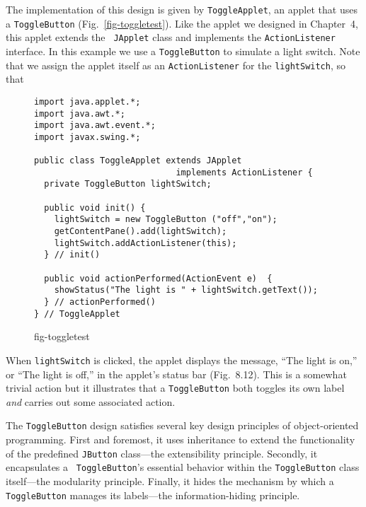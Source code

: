 The implementation of this design is given by {\tt ToggleApplet}, an
applet that uses a {\tt ToggleButton} (Fig.~\ref{fig-toggletest}).
Like the applet we designed in Chapter~4, this applet extends the {\tt
JApplet} class and implements the {\tt ActionListener} interface.  In
this example we use a {\tt ToggleButton} to simulate a light switch.
Note that we assign the applet itself as an {\tt ActionListener} for
the {\tt lightSwitch}, so that

\begin{figure}[tb]
\jjjprogstart
\begin{jjjlisting}
\begin{lstlisting}
import java.applet.*;
import java.awt.*;
import java.awt.event.*;
import javax.swing.*;

public class ToggleApplet extends JApplet 
                            implements ActionListener {
  private ToggleButton lightSwitch;  

  public void init() {
    lightSwitch = new ToggleButton ("off","on");
    getContentPane().add(lightSwitch);
    lightSwitch.addActionListener(this);
  } // init()

  public void actionPerformed(ActionEvent e)  {
    showStatus("The light is " + lightSwitch.getText());
  } // actionPerformed()
} // ToggleApplet
\end{lstlisting}
\end{jjjlisting}
{fig-toggletest}
\end{figure}

When {\tt lightSwitch} is clicked, the applet displays the message,
``The light is on,'' or ``The light is off,'' in the applet's status
bar (Fig.~8.12). This is a somewhat trivial action but it illustrates
that a {\tt ToggleButton} both toggles its own label {\it and} carries
out some associated action.

\begin{figure}[h!]
\end{figure}

The {\tt ToggleButton} design satisfies several key design
principles of object-oriented
programming.  First and foremost, it uses inheritance to extend the
functionality of the predefined {\tt JButton} class---the
extensibility principle. Secondly, it encapsulates a {\tt
ToggleButton}'s essential behavior within the {\tt ToggleButton} class
itself---the modularity principle. Finally, it hides the mechanism by
which a {\tt ToggleButton} manages its labels---the information-hiding
principle.

